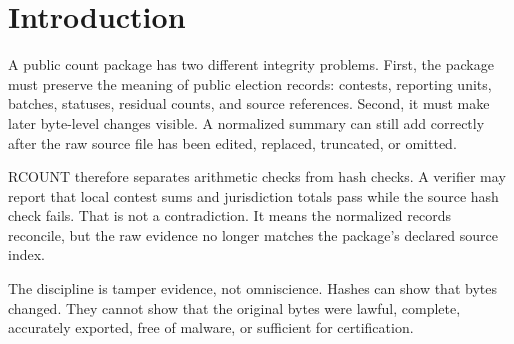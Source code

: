 \section{Introduction}

A public count package has two different integrity problems. First, the package
must preserve the meaning of public election records: contests, reporting units,
batches, statuses, residual counts, and source references. Second, it must make
later byte-level changes visible. A normalized summary can still add correctly
after the raw source file has been edited, replaced, truncated, or omitted.

RCOUNT therefore separates arithmetic checks from hash checks. A verifier may
report that local contest sums and jurisdiction totals pass while the source
hash check fails. That is not a contradiction. It means the normalized records
reconcile, but the raw evidence no longer matches the package's declared source
index.

The discipline is tamper evidence, not omniscience. Hashes can show that bytes
changed. They cannot show that the original bytes were lawful, complete,
accurately exported, free of malware, or sufficient for certification.
